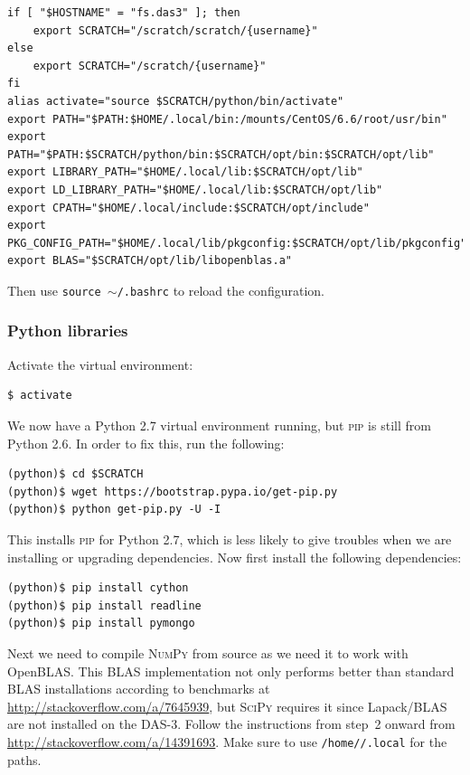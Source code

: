 \documentclass{article}
\begin{document}
\begin{verbatim}
if [ "$HOSTNAME" = "fs.das3" ]; then
    export SCRATCH="/scratch/scratch/{username}"
else
    export SCRATCH="/scratch/{username}"
fi
alias activate="source $SCRATCH/python/bin/activate"
export PATH="$PATH:$HOME/.local/bin:/mounts/CentOS/6.6/root/usr/bin"
export PATH="$PATH:$SCRATCH/python/bin:$SCRATCH/opt/bin:$SCRATCH/opt/lib"
export LIBRARY_PATH="$HOME/.local/lib:$SCRATCH/opt/lib"
export LD_LIBRARY_PATH="$HOME/.local/lib:$SCRATCH/opt/lib"
export CPATH="$HOME/.local/include:$SCRATCH/opt/include"
export PKG_CONFIG_PATH="$HOME/.local/lib/pkgconfig:$SCRATCH/opt/lib/pkgconfig"
export BLAS="$SCRATCH/opt/lib/libopenblas.a"
\end{verbatim}

Then use \texttt{source $\sim$/.bashrc} to reload the configuration.

\subsubsection{Python libraries}\label{app:python-libraries}
Activate the virtual environment:

\begin{verbatim}
$ activate
\end{verbatim}

We now have a Python 2.7 virtual environment running, but \textsc{pip} is still 
from Python 2.6. In order to fix this, run the following:

\begin{verbatim}
(python)$ cd $SCRATCH
(python)$ wget https://bootstrap.pypa.io/get-pip.py
(python)$ python get-pip.py -U -I
\end{verbatim}

This installs \textsc{pip} for Python 2.7, which is less likely to give 
troubles when we are installing or upgrading dependencies. Now first install the following dependencies:

\begin{verbatim}
(python)$ pip install cython
(python)$ pip install readline
(python)$ pip install pymongo
\end{verbatim}

Next we need to compile \textsc{NumPy} from source as we need it to work with 
OpenBLAS\@. This BLAS implementation not only performs better than standard
BLAS installations according to benchmarks at 
\url{http://stackoverflow.com/a/7645939}, but \textsc{SciPy} requires it 
since Lapack/BLAS are not installed on the DAS-3. Follow the instructions 
from step~2 onward from \url{http://stackoverflow.com/a/14391693}. Make sure to 
use \texttt{/home//.local} for the paths.
\end{document}
